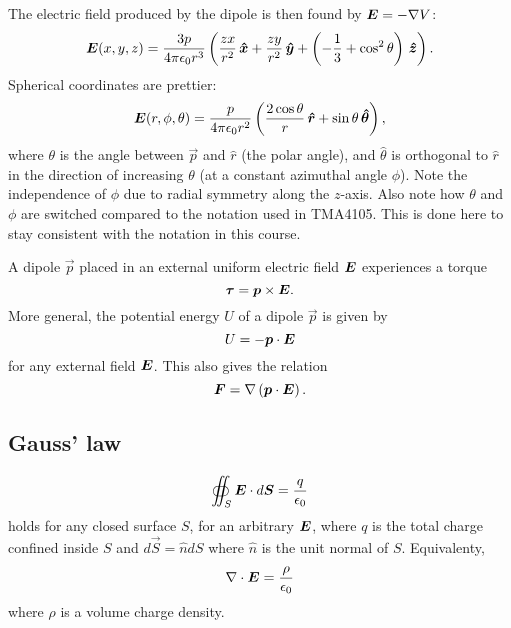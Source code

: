     The electric field produced by the dipole is then found by $\bm{E} = -\nabla V$:
    \begin{equation}
        \E(x, y, z) = \frac{3p}{4\pi\e r^3}\left(\frac{zx}{r^2}\,\hat{x} + 
        \frac{zy}{r^2}\,\hat{y} + \left( -\frac{1}{3} +\cos^2\theta\right)\,\hat{z}\right).
    \end{equation}
    Spherical coordinates are prettier: 
    \begin{equation}
        \E(r, \phi, \theta) = \frac{p}{4\pi\e r^2}\left(\frac{2\cos\theta}{r}\,\hat{r} + \sin\theta \, \hat{\theta}\right),
    \end{equation}
    where $\theta$ is the angle between $\vec{p}$ and $\hat{r}$ (the polar angle), 
    and $\hat{\theta}$ is orthogonal to $\hat{r}$ in the direction of increasing $\theta$ (at a constant azimuthal angle $\phi$). 
    Note the independence of $\phi$ due to radial symmetry along the $z$-axis. 
    Also note how $\theta$ and $\phi$ are switched compared to the notation used in TMA4105. 
    This is done here to stay consistent with the notation in this course.
    
    A dipole $\vec{p}$ placed in an external uniform electric field $\bm{E}$ experiences a torque
    \begin{equation}
        \bm{\tau} = \bm{p} \times \bm{E}.
    \end{equation}
    More general, the potential energy $U$ of a dipole $\vec{p}$ is given by
    \begin{equation}
        U = -\bm{p}\cdot \bm{E}
    \end{equation}
    for any external field $\bm{E}$. This also gives the relation 
    \begin{equation}
        \bm{F} = \nabla\left(\bm{p}\cdot\bm{E}\right).
    \end{equation}

\subsection{Gauss' law}
    \begin{equation}
        \oiint_S \bm{E}\cdot d\bm{S} = \frac{q}{\epsilon_0}
    \end{equation}
    holds for any closed surface $S$, for an arbitrary $\bm{E}$, 
    where $q$ is the total charge confined inside $S$ and $d\vec{S} = \hat{n}dS$ where $\hat{n}$ is the unit normal of $S$. Equivalenty, 
    \begin{equation}
        \nabla \cdot \bm{E} = \frac{\rho}{\epsilon_0}
    \end{equation}
    where $\rho$ is a volume charge density. 

